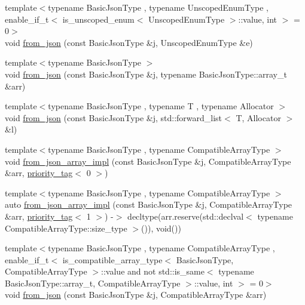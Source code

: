 \begin{DoxyCompactItemize}
\item 
{\footnotesize template$<$typename Basic\+Json\+Type , typename Unscoped\+Enum\+Type , enable\+\_\+if\+\_\+t$<$ is\+\_\+unscoped\+\_\+enum$<$ Unscoped\+Enum\+Type $>$\+::value, int $>$  = 0$>$ }\\void \mbox{\hyperlink{namespacenlohmann_1_1detail_acf8dd944c2c7455880dee6f0b355aa01}{from\+\_\+json}} (const Basic\+Json\+Type \&j, Unscoped\+Enum\+Type \&e)
\item 
{\footnotesize template$<$typename Basic\+Json\+Type $>$ }\\void \mbox{\hyperlink{namespacenlohmann_1_1detail_abc62958462b916726b89f25fa381a129}{from\+\_\+json}} (const Basic\+Json\+Type \&j, typename Basic\+Json\+Type\+::array\+\_\+t \&arr)
\item 
{\footnotesize template$<$typename Basic\+Json\+Type , typename T , typename Allocator $>$ }\\void \mbox{\hyperlink{namespacenlohmann_1_1detail_a7fb5b5b8034d347b702d31d7fec4ecd7}{from\+\_\+json}} (const Basic\+Json\+Type \&j, std\+::forward\+\_\+list$<$ T, Allocator $>$ \&l)
\item 
{\footnotesize template$<$typename Basic\+Json\+Type , typename Compatible\+Array\+Type $>$ }\\void \mbox{\hyperlink{namespacenlohmann_1_1detail_ac53673a5ce29fb69b96d41dad33cb3b0}{from\+\_\+json\+\_\+array\+\_\+impl}} (const Basic\+Json\+Type \&j, Compatible\+Array\+Type \&arr, \mbox{\hyperlink{structnlohmann_1_1detail_1_1priority__tag}{priority\+\_\+tag}}$<$ 0 $>$)
\item 
{\footnotesize template$<$typename Basic\+Json\+Type , typename Compatible\+Array\+Type $>$ }\\auto \mbox{\hyperlink{namespacenlohmann_1_1detail_a57f93ed57254a1639087cdc316e0fb83}{from\+\_\+json\+\_\+array\+\_\+impl}} (const Basic\+Json\+Type \&j, Compatible\+Array\+Type \&arr, \mbox{\hyperlink{structnlohmann_1_1detail_1_1priority__tag}{priority\+\_\+tag}}$<$ 1 $>$) -\/$>$ decltype(arr.\+reserve(std\+::declval$<$ typename Compatible\+Array\+Type\+::size\+\_\+type $>$()), void())
\item 
{\footnotesize template$<$typename Basic\+Json\+Type , typename Compatible\+Array\+Type , enable\+\_\+if\+\_\+t$<$ is\+\_\+compatible\+\_\+array\+\_\+type$<$ Basic\+Json\+Type, Compatible\+Array\+Type $>$\+::value and not std\+::is\+\_\+same$<$ typename Basic\+Json\+Type\+::array\+\_\+t, Compatible\+Array\+Type $>$\+::value, int $>$  = 0$>$ }\\void \mbox{\hyperlink{namespacenlohmann_1_1detail_a8dcac00852dbe1f61d1e78135b19d428}{from\+\_\+json}} (const Basic\+Json\+Type \&j, Compatible\+Array\+Type \&arr)

\end{DoxyCompactItemize}
